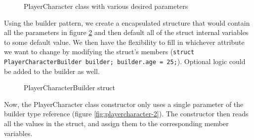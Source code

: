 \begin{multicols}{2}
\begin{figure}[H]

	\caption{PlayerCharacter class with various desired parameters}
	\label{fig:playercharacter-1}
\end{figure}

Using the builder pattern, we create a encapsulated structure that would contain all the parameters in figure \ref{fig:playercharacter-builder} and then default all of the struct internal variables to some default value. We then have the flexibility to fill in whichever attribute we want to change by modifying the struct's members (\texttt{struct PlayerCharacterBuilder builder; builder.age = 25;}). Optional logic could be added to the builder as well.

\begin{figure}[H]
	\centering


	\caption{PlayerCharacterBuilder struct}
	\label{fig:playercharacter-builder}
\end{figure}

Now, the PlayerCharacter class constructor only uses a single parameter of the builder type reference (figure \ref{fig:playercharacter-2}). The constructor then reads all the values in the struct, and assign them to the corresponding member variables.

\begin{figure}[H]
	\centering



\end{figure}
\end{multicols}
